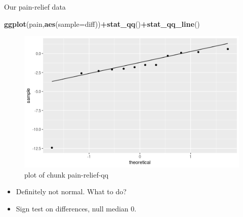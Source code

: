 \documentclass[ignorenonframetext,]{beamer}
\newenvironment{Shaded}{\begin{snugshade}}{\end{snugshade}}
\newcommand{\DataTypeTok}[1]{\textcolor[rgb]{0.13,0.29,0.53}{#1}}
\newcommand{\KeywordTok}[1]{\textcolor[rgb]{0.13,0.29,0.53}{\textbf{#1}}}
\newcommand{\NormalTok}[1]{#1}
\newcommand{\OperatorTok}[1]{\textcolor[rgb]{0.81,0.36,0.00}{\textbf{#1}}}
\providecommand{\tightlist}{%
  \setlength{\itemsep}{0pt}\setlength{\parskip}{0pt}}
\begin{document}
\begin{frame}[fragile]{Our pain-relief data}
\protect\hypertarget{our-pain-relief-data}{}

\begin{Shaded}
\begin{Highlighting}[]
\KeywordTok{ggplot}\NormalTok{(pain,}\KeywordTok{aes}\NormalTok{(}\DataTypeTok{sample=}\NormalTok{diff))}\OperatorTok{+}\KeywordTok{stat_qq}\NormalTok{()}\OperatorTok{+}\KeywordTok{stat_qq_line}\NormalTok{()}
\end{Highlighting}
\end{Shaded}

\begin{figure}
\centering
\includegraphics{figure/pain-relief-qq-1.png}
\caption{plot of chunk pain-relief-qq}
\end{figure}

\begin{itemize}
\tightlist
\item
  Definitely not normal. What to do?
\item
  Sign test on differences, null median 0.
\end{itemize}

\end{frame}
\end{document}
